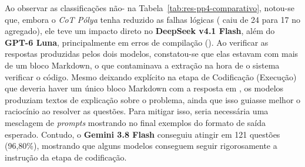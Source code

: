 Ao observar as classificações não- na Tabela~\ref{tab:res-pp4-comparativo}, notou-se que, embora o \textit{CoT Pólya} tenha reduzido as falhas lógicas ( caiu de 24 para 17 no agregado), ele teve um impacto direto no \textbf{DeepSeek v4.1 Flash}, além do \textbf{GPT-6 Luna}, principalmente em erros de compilação (). Ao verificar as respostas produzidas pelos dois modelos, constatou-se que elas estavam com mais de um bloco Markdown, o que contaminava a extração na hora de o sistema verificar o código. Mesmo deixando explícito na etapa de Codificação (Execução) que deveria haver um único bloco Markdown com a resposta em , os modelos produziam textos de explicação sobre o problema, ainda que isso guiasse melhor o raciocínio ao resolver as questões. Para mitigar isso, seria necessária uma mesclagem de \textit{prompts} mostrando no final exemplos do formato de saída esperado. Contudo, o \textbf{Gemini 3.8 Flash} conseguiu atingir  em 121 questões (96,80\%), mostrando que alguns modelos conseguem seguir rigorosamente a instrução da etapa de codificação.

\begin{table}[!htbp]
\centering
\caption[Telemetria média de tokens, custo total e custo por AC na PP4]{Telemetria média de \textit{tokens}, custo total nas $125$ questões e custo por  na PP4 (, $T = 0$).}
\label{tab:res-pp4-custos}
\end{table}

